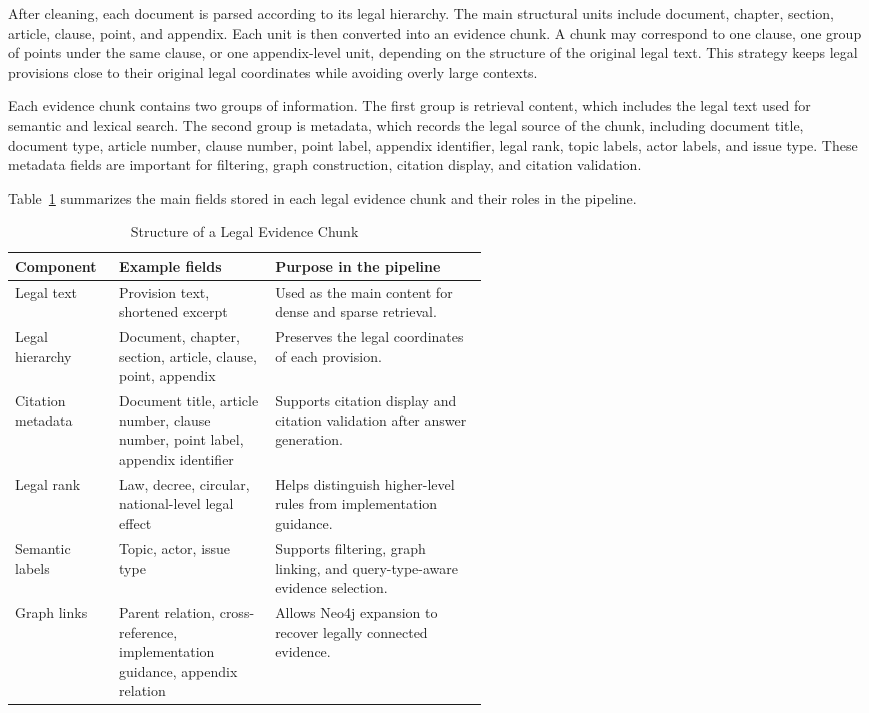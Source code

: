 After cleaning, each document is parsed according to its legal hierarchy. The main structural units include document, chapter, section, article, clause, point, and appendix. Each unit is then converted into an evidence chunk. A chunk may correspond to one clause, one group of points under the same clause, or one appendix-level unit, depending on the structure of the original legal text. This strategy keeps legal provisions close to their original legal coordinates while avoiding overly large contexts.

Each evidence chunk contains two groups of information. The first group is retrieval content, which includes the legal text used for semantic and lexical search. The second group is metadata, which records the legal source of the chunk, including document title, document type, article number, clause number, point label, appendix identifier, legal rank, topic labels, actor labels, and issue type. These metadata fields are important for filtering, graph construction, citation display, and citation validation.

Table~\ref{tab:evidence-chunk-structure} summarizes the main fields stored in each legal evidence chunk and their roles in the pipeline.

\begin{table}[htbp]
  \centering
  \caption{Structure of a Legal Evidence Chunk}
  \label{tab:evidence-chunk-structure}
  \small
  \begin{tabularx}{\linewidth}{@{}p{0.22\linewidth}p{0.33\linewidth}X@{}}
    \toprule
    \textbf{Component} & \textbf{Example fields} & \textbf{Purpose in the pipeline} \\
    \midrule
    Legal text & Provision text, shortened excerpt & Used as the main content for dense and sparse retrieval. \\
    Legal hierarchy & Document, chapter, section, article, clause, point, appendix & Preserves the legal coordinates of each provision. \\
    Citation metadata & Document title, article number, clause number, point label, appendix identifier & Supports citation display and citation validation after answer generation. \\
    Legal rank & Law, decree, circular, national-level legal effect & Helps distinguish higher-level rules from implementation guidance. \\
    Semantic labels & Topic, actor, issue type & Supports filtering, graph linking, and query-type-aware evidence selection. \\
    Graph links & Parent relation, cross-reference, implementation guidance, appendix relation & Allows Neo4j expansion to recover legally connected evidence. \\
    \bottomrule
  \end{tabularx}
\end{table}

